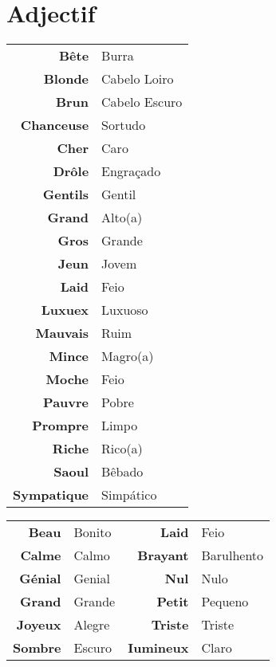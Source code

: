 \documentclass{article}
\begin{document}
\section{Adjectif}
        \begin{center}
            \begin{tabular}{r l}
                \textbf{Bête}       & Burra\\
                \textbf{Blonde}     & Cabelo Loiro\\
                \textbf{Brun}       & Cabelo Escuro\\
                \textbf{Chanceuse}  & Sortudo\\
                \textbf{Cher}       & Caro\\
                \textbf{Drôle}      & Engraçado\\
                \textbf{Gentils}    & Gentil\\
                \textbf{Grand}      & Alto(a)\\
                \textbf{Gros}       & Grande\\
                \textbf{Jeun}       & Jovem\\
                \textbf{Laid}       & Feio\\
                \textbf{Luxuex}     & Luxuoso\\
                \textbf{Mauvais}    & Ruim\\
                \textbf{Mince}      & Magro(a)\\
                \textbf{Moche}      & Feio\\
                \textbf{Pauvre}     & Pobre\\
                \textbf{Prompre}    & Limpo\\
                \textbf{Riche}      & Rico(a)\\
                \textbf{Saoul}      & Bêbado\\
                \textbf{Sympatique} & Simpático\\
            \end{tabular}
        \end{center}

        \begin{center}
            \begin{tabular}{r l r l}
                \textbf{Beau}   & Bonito & \textbf{Laid}     & Feio\\
                \textbf{Calme}  & Calmo  & \textbf{Brayant}  & Barulhento\\
                \textbf{Génial} & Genial & \textbf{Nul}      & Nulo\\
                \textbf{Grand}  & Grande & \textbf{Petit}    & Pequeno\\
                \textbf{Joyeux} & Alegre & \textbf{Triste}   & Triste\\
                \textbf{Sombre} & Escuro & \textbf{Iumineux} & Claro\\
            \end{tabular}
        \end{center}
\end{document}
